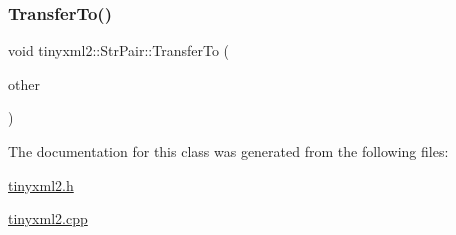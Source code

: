 \mbox{\label{classtinyxml2_1_1_str_pair_a35f795b1557fe5fdcbd93d3cc5d6b939}} 
\subsubsection{\texorpdfstring{Transfer\+To()}{TransferTo()}}
{\footnotesize\ttfamily void tinyxml2\+::\+Str\+Pair\+::\+Transfer\+To (\begin{DoxyParamCaption}\item[{\hyperlink{classtinyxml2_1_1_str_pair}{Str\+Pair} $\ast$}]{other }\end{DoxyParamCaption})}



The documentation for this class was generated from the following files\+:\begin{DoxyCompactItemize}
\item 
\hyperlink{tinyxml2_8h}{tinyxml2.\+h}\item 
\hyperlink{tinyxml2_8cpp}{tinyxml2.\+cpp}\end{DoxyCompactItemize}
